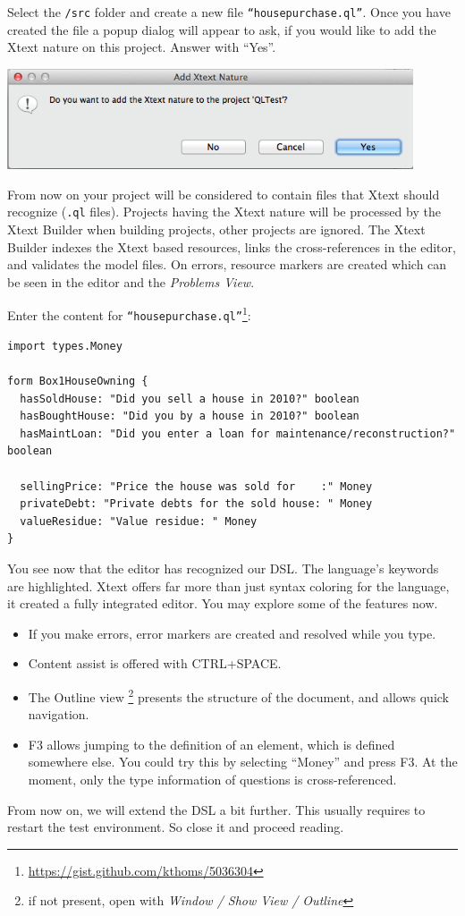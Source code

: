 Select the \texttt{/src} folder and create a new file
\texttt{``housepurchase.ql''}. Once you have created the file a popup dialog
will appear to ask, if you would like to add the Xtext nature on this project.
Answer with ``Yes''.

\includegraphics[width=12cm]{./images/chapter01/AddXtextNature.png}

From now on your project will be considered to contain files that Xtext should
recognize (\texttt{.ql} files). Projects having the Xtext nature will be processed by the
Xtext Builder when building projects, other projects are ignored. The Xtext
Builder indexes the Xtext based resources, links the cross-references in the
editor, and validates the model files. On errors, resource markers are created
which can be seen in the editor and the \emph{Problems View}.

Enter the content for
\texttt{``housepurchase.ql''}\footnote{\url{https://gist.github.com/kthoms/5036304}}:
\begin{lstlisting}[language=QL]
import types.Money

form Box1HouseOwning {
  hasSoldHouse: "Did you sell a house in 2010?" boolean
  hasBoughtHouse: "Did you by a house in 2010?" boolean
  hasMaintLoan: "Did you enter a loan for maintenance/reconstruction?" boolean

  sellingPrice: "Price the house was sold for    :" Money
  privateDebt: "Private debts for the sold house: " Money
  valueResidue: "Value residue: " Money
}
\end{lstlisting}

You see now that the editor has recognized our DSL. The language's keywords are
highlighted. Xtext offers far more than just syntax coloring for the language,
it created a fully integrated editor. You may explore some of the features now.

\begin{itemize}
  \item If you make errors, error markers are created and resolved while
you type.
\item Content assist is offered with CTRL+SPACE.
\item The Outline view \footnote{if not present, open with \emph{Window / Show View /
Outline}} presents the structure of the document, and allows quick navigation.
\item F3 allows jumping to the definition of an element, which is defined
somewhere else. You could try this by selecting ``Money'' and press F3. At the
moment, only the type information of questions is cross-referenced.
\end{itemize}

From now on, we will extend the DSL a bit further. This usually requires to
restart the test environment. So close it and proceed reading.

